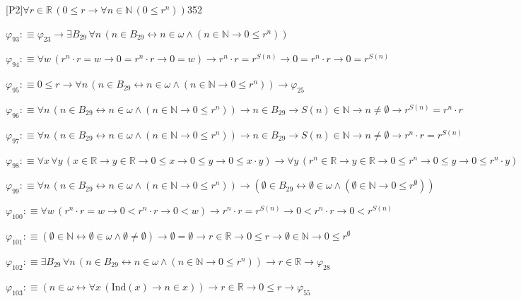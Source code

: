 \begin{fullproof}{[P2]}{$\forall r \in \mathbb{R}\,(0 \leq r \to \forall n \in \mathbb{N}\,(0 \leq {{r}^{n}}))$}{352}
\begin{abbrevlist}
\item $\varphi_{93} :\equiv \varphi_{23} \to \exists B_{29}\,\forall n\,(n \in B_{29} \leftrightarrow n \in \omega \land (n \in \mathbb{N} \to 0 \leq {{r}^{n}}))$
\item $\varphi_{94} :\equiv \forall w\,({{r}^{n}} \cdot r = w \to 0 = {{r}^{n}} \cdot r \to 0 = w) \to {{r}^{n}} \cdot r = {{r}^{S(n)}} \to 0 = {{r}^{n}} \cdot r \to 0 = {{r}^{S(n)}}$
\item $\varphi_{95} :\equiv 0 \leq r \to \forall n\,(n \in B_{29} \leftrightarrow n \in \omega \land (n \in \mathbb{N} \to 0 \leq {{r}^{n}})) \to \varphi_{25}$
\item $\varphi_{96} :\equiv \forall n\,(n \in B_{29} \leftrightarrow n \in \omega \land (n \in \mathbb{N} \to 0 \leq {{r}^{n}})) \to n \in B_{29} \to S(n) \in \mathbb{N} \to n \neq \emptyset \to {{r}^{S(n)}} = {{r}^{n}} \cdot r$
\item $\varphi_{97} :\equiv \forall n\,(n \in B_{29} \leftrightarrow n \in \omega \land (n \in \mathbb{N} \to 0 \leq {{r}^{n}})) \to n \in B_{29} \to S(n) \in \mathbb{N} \to n \neq \emptyset \to {{r}^{n}} \cdot r = {{r}^{S(n)}}$
\item $\varphi_{98} :\equiv \forall x\,\forall y\,(x \in \mathbb{R} \to y \in \mathbb{R} \to 0 \leq x \to 0 \leq y \to 0 \leq x \cdot y) \to \forall y\,({{r}^{n}} \in \mathbb{R} \to y \in \mathbb{R} \to 0 \leq {{r}^{n}} \to 0 \leq y \to 0 \leq {{r}^{n}} \cdot y)$
\item $\varphi_{99} :\equiv \forall n\,(n \in B_{29} \leftrightarrow n \in \omega \land (n \in \mathbb{N} \to 0 \leq {{r}^{n}})) \to (\emptyset \in B_{29} \leftrightarrow \emptyset \in \omega \land (\emptyset \in \mathbb{N} \to 0 \leq {{r}^{\emptyset}}))$
\item $\varphi_{100} :\equiv \forall w\,({{r}^{n}} \cdot r = w \to 0 < {{r}^{n}} \cdot r \to 0 < w) \to {{r}^{n}} \cdot r = {{r}^{S(n)}} \to 0 < {{r}^{n}} \cdot r \to 0 < {{r}^{S(n)}}$
\item $\varphi_{101} :\equiv (\emptyset \in \mathbb{N} \leftrightarrow \emptyset \in \omega \land \emptyset \neq \emptyset) \to \emptyset = \emptyset \to r \in \mathbb{R} \to 0 \leq r \to \emptyset \in \mathbb{N} \to 0 \leq {{r}^{\emptyset}}$
\item $\varphi_{102} :\equiv \exists B_{29}\,\forall n\,(n \in B_{29} \leftrightarrow n \in \omega \land (n \in \mathbb{N} \to 0 \leq {{r}^{n}})) \to r \in \mathbb{R} \to \varphi_{28}$
\item $\varphi_{103} :\equiv (n \in \omega \leftrightarrow \forall x\,(\mathrm{Ind}(x) \to n \in x)) \to r \in \mathbb{R} \to 0 \leq r \to \varphi_{55}$

\end{abbrevlist}
\end{fullproof}
